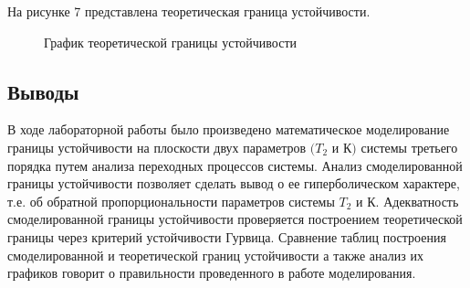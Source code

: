 \documentclass[a4paper, 11pt]{article}
\begin{document}
\par 
На рисунке 7 представлена теоретическая граница устойчивости.

\begin{figure}[h!]
\centering
{}
\caption{График теоретической границы устойчивости}
\end{figure}

\newpage
\begin{center}
\section*{Выводы}
\end{center}
\par 
В ходе лабораторной работы было произведено математическое моделирование границы устойчивости на плоскости двух параметров $(T_2$ и $К)$ системы третьего порядка путем анализа переходных процессов системы. Анализ смоделированной  границы устойчивости позволяет сделать вывод о ее гиперболическом характере, т.е. об обратной пропорциональности параметров системы  $T_2$ и $К$. Адекватность смоделированной границы устойчивости проверяется построением теоретической границы через критерий устойчивости Гурвица. Сравнение таблиц построения смоделированной и теоретической границ устойчивости а также анализ их графиков говорит о правильности проведенного в работе моделирования.   
\end{document}
